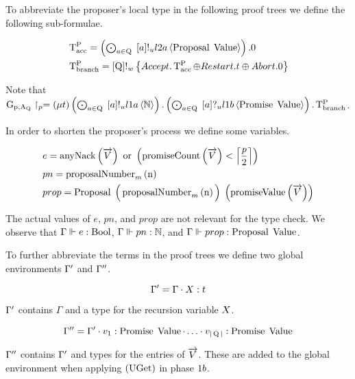 To abbreviate the proposer's local type in the following proof trees we define the following sub-formulae.

\begin{align*}
&\operatorname{T^{P}_{acc}} = \textstyle\left(\bigodot_{a\in\operatorname{Q}}\;\left[a\right]!_u l2a \left\langle \operatorname{Proposal}\; \operatorname{Value} \right\rangle\right).0\\
&\operatorname{T^{P}_{branch}} = \left[\operatorname{Q}\right]!_w \left\{\mathnormal{Accept} . \operatorname{T^{P}_{acc}} \oplus \mathnormal{Restart} . t \oplus \mathnormal{Abort} .0\right\}
\end{align*}

Note that $\operatorname{G_{p, A_Q}} \upharpoonright_{p} = \left(\mu t\right)
\textstyle\left(\bigodot_{a\in\operatorname{Q}}\;\left[a\right]!_u l1a \left\langle \mathbb{N} \right\rangle\right) .
\textstyle\left(\bigodot_{a\in\operatorname{Q}}\;\left[a\right]?_u l1b \left\langle \operatorname{Promise}\; \operatorname{Value} \right\rangle\right) . \operatorname{T^{P}_{branch}}$.

In order to shorten the proposer's process we define some variables.

\begin{align*}
&e = \operatorname{anyNack}\left(\overrightarrow{V}\right) \text{ or } \left(\operatorname{promiseCount}\left(\overrightarrow{V}\right) < \Big\lceil \frac{p}{2} \Big\rceil\right)\\
&pn = \operatorname{proposalNumber}_m\left( \operatorname{n}\right)\\
&prop = \operatorname{Proposal}\; \Big ( \operatorname{proposalNumber}_m\left( \operatorname{n}\right) \Big )\; \left(\operatorname{promiseValue}\left(\overrightarrow{V}\right)\right)
\end{align*}

The actual values of $e$, $pn$, and $prop$ are not relevant for the type check.
We observe that $\Gamma\Vdash e:\operatorname{Bool}$, $\Gamma\Vdash pn:\mathbb{N}$, and $\Gamma\Vdash prop:\operatorname{Proposal}\; \operatorname{Value}$.

To further abbreviate the terms in the proof trees we define two global environments $\Gamma'$ and $\Gamma''$.

\[\Gamma'=\Gamma\cdot X:t\]

$\Gamma'$ contains $\Gamma$ and a type for the recursion variable $X$.

\[\Gamma'' = \Gamma' \cdot v_{1}:\operatorname{Promise}\; \operatorname{Value}\cdot\ldots\cdot v_{|\operatorname{Q}|}:\operatorname{Promise}\; \operatorname{Value}\]

$\Gamma''$ contains $\Gamma'$ and types for the entries of $\overrightarrow{V}$.
These are added to the global environment when applying $\left(\operatorname{UGet}\right)$ in phase $1b$.

